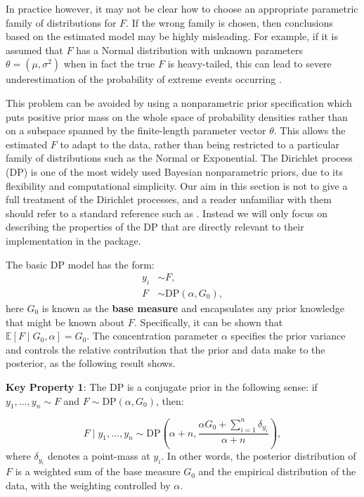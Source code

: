 \documentclass[nojss]{jss}
\begin{document}
In practice however, it may not be clear how to choose an appropriate parametric family of distributions for $F$. If the wrong family is chosen, then conclusions based on the estimated model may be highly misleading. For example, if it is assumed that $F$ has a Normal distribution with unknown parameters $\theta=(\mu,\sigma^2)$ when in fact the true $F$ is heavy-tailed, this can lead to severe underestimation of the probability of extreme events occurring \citep{coles_introduction_2001}.

This problem can be avoided by using a nonparametric prior specification which puts positive prior mass on the whole space of probability densities rather than on a subspace spanned by the finite-length parameter vector $\theta$. This allows the estimated $F$ to adapt to the data, rather than being restricted to a particular family of distributions such as the Normal or Exponential. The Dirichlet process (DP) is one of the most widely used Bayesian nonparametric priors, due to its flexibility and computational simplicity.  Our aim in this section is not to give a full treatment of the Dirichlet processes, and a reader unfamiliar with them should refer to a standard reference such as \cite{antoniak_mixtures_1974}. Instead we will only focus on describing the properties of the DP that are directly relevant to their implementation in the  package.

The basic DP model has the form:
\begin{align*}
y_i & \sim F, \\
F & \sim \text{DP} (\alpha, G_0),
\end{align*}
here $G_0$ is known as the \textbf{base measure} and encapsulates any prior knowledge that might be known about $F$.  Specifically, it can be shown that $\mathbb{E}[F \mid G_0,\alpha] = G_0$. The concentration parameter $\alpha$ specifies the prior variance and controls the relative contribution that the prior and data make to the posterior, as the following result shows.

\begin{tcolorbox}

\textbf{Key Property 1}: The DP is a conjugate prior in the following sense: if $y_1,\ldots,y_n \sim F$ and $F \sim \text{DP} (\alpha, G_0)$, then:

$$F \mid y_1,\ldots,y_n \sim \text{DP} \left( \alpha + n, \frac{\alpha G_0 + \sum_{i=1}^n \delta_{y_i}}{\alpha+n}\right),$$
where $\delta_{y_i}$ denotes a point-mass at $y_i$. In other words, the posterior distribution of $F$ is a weighted sum of the base measure $G_0$ and the empirical distribution of the data, with the weighting controlled by $\alpha$.

\end{tcolorbox}
\end{document}
